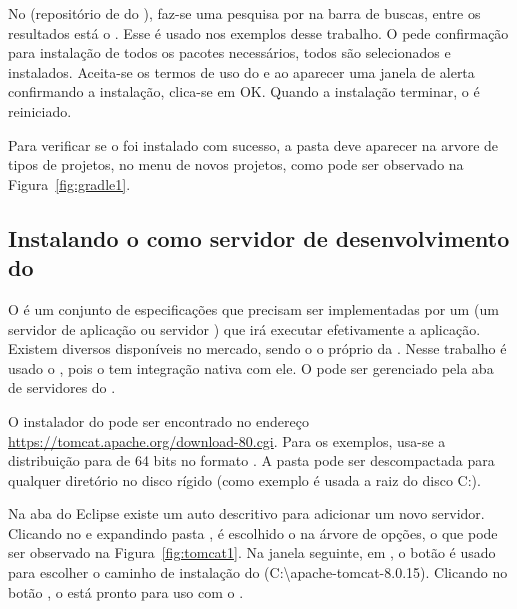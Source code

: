 No  (repositório de  do ), faz-se uma pesquisa por  na barra de buscas, entre os resultados está o . Esse  é usado nos exemplos desse trabalho. O  pede confirmação para instalação de todos os pacotes necessários, todos são selecionados e instalados. Aceita-se os termos de uso do  e ao aparecer uma janela de alerta confirmando a instalação, clica-se em OK. Quando a instalação terminar, o  é reiniciado.

Para verificar se o  foi instalado com sucesso, a pasta  deve aparecer na arvore de tipos de projetos, no menu de novos projetos, como pode ser observado na Figura~\ref{fig:gradle1}.


\subsection{Instalando o  como servidor de desenvolvimento do } 

O  é um conjunto de especificações que precisam ser implementadas por um  (um servidor de aplicação ou servidor ) que irá executar efetivamente a aplicação. Existem diversos  disponíveis no mercado, sendo o  o próprio  da . Nesse trabalho é usado o , pois o  tem integração nativa com ele. O  pode ser gerenciado pela aba de servidores do .

O instalador do  pode ser encontrado no endereço \url{https://tomcat.apache.org/download-80.cgi}. Para os exemplos, usa-se a distribuição para  de 64 bits no formato . A pasta  pode ser descompactada para qualquer diretório no disco rígido (como exemplo é usada a raiz do disco C:).  

Na aba  do Eclipse existe um  auto descritivo para adicionar um novo servidor. Clicando no  e expandindo pasta , é escolhido o  na árvore de opções, o que pode ser observado na Figura~\ref{fig:tomcat1}. Na janela seguinte, em , o botão  é usado para escolher o caminho de instalação do  (C:\textbackslash apache-tomcat-\textmd{8.0.15}). Clicando no botão , o  está pronto para uso com o . 

